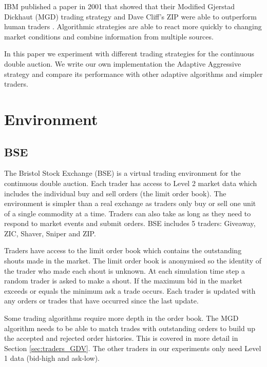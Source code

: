 \documentclass[preprint]{acm_proc_article-sp} %
\begin{document}
IBM published a paper in 2001 that showed that their Modified Gjerstad Dickhaut
(MGD) trading strategy and Dave Cliff's ZIP were able to outperform human
traders \cite{ibm_human}.  Algorithmic strategies are able to react more
quickly to changing market conditions and combine information from multiple
sources.

In this paper we experiment with different trading strategies for the
continuous double auction.  We write our own implementation the Adaptive
Aggressive strategy \cite{AA_thesis} and compare its performance with other
adaptive algorithms and simpler traders.\\



\section{Environment} \label{sec:environment}
\subsection{BSE} \label{sec:BSE}
The Bristol Stock Exchange (BSE) is a virtual trading environment for the
continuous double auction. Each trader has access to Level 2 market data which
includes the individual buy and sell orders (the limit order book). The
environment is simpler than a real exchange as traders only buy or sell one
unit of a single commodity at a time. Traders can also take as long as they
need to respond to market events and submit orders. BSE includes 5 traders: Giveaway, ZIC, Shaver, Sniper and ZIP.

Traders have access to the limit order book which contains the outstanding
shouts made in the market. The limit order book is anonymised so the identity
of the trader who made each shout is unknown. At each simulation time step a
random trader is asked to make a shout. If the maximum bid in the market
exceeds or equals the minimum ask a trade occurs. Each trader is updated with
any orders or trades that have occurred since the last update.

Some trading algorithms require more depth in the order book. The MGD algorithm needs to be able to match trades with
outstanding orders to build up the accepted and rejected order histories.
This is covered in more detail in Section \ref{sec:traders_GDV}. The
other traders in our experiments only need Level 1 data
(bid-high and ask-low).
\end{document}
